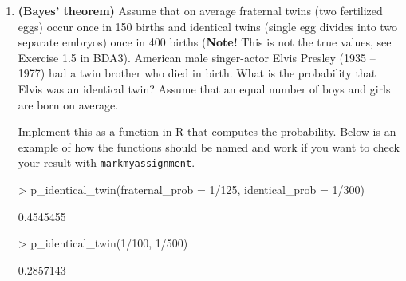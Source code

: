 \documentclass[11pt,a4paper,english]{article}
\begin{document}
\begin{enumerate}
\item {\bf (Bayes' theorem)} Assume that on average fraternal twins (two fertilized eggs) occur once in 150 births and identical twins (single egg divides into two separate
embryos) once in 400 births (\textbf{Note!} This is not the true values, see Exercise 1.5 in BDA3).
American male singer-actor Elvis Presley (1935 -- 1977) had a twin brother who died in birth.
What is the probability that Elvis was an identical twin?
Assume that an equal number of boys and girls are born on average.

Implement this as a function in R that computes the probability. Below is an example of how the functions should be named and work if you want to check your result with \texttt{markmyassignment}. 


\begin{Schunk}
\begin{Sinput}
> p_identical_twin(fraternal_prob = 1/125, identical_prob = 1/300)
\end{Sinput}
\begin{Soutput}
[1] 0.4545455
\end{Soutput}
\end{Schunk}


\begin{Schunk}
\begin{Sinput}
> p_identical_twin(1/100, 1/500)
\end{Sinput}
\begin{Soutput}
[1] 0.2857143
\end{Soutput}
\end{Schunk}

\end{enumerate}
\end{document}
